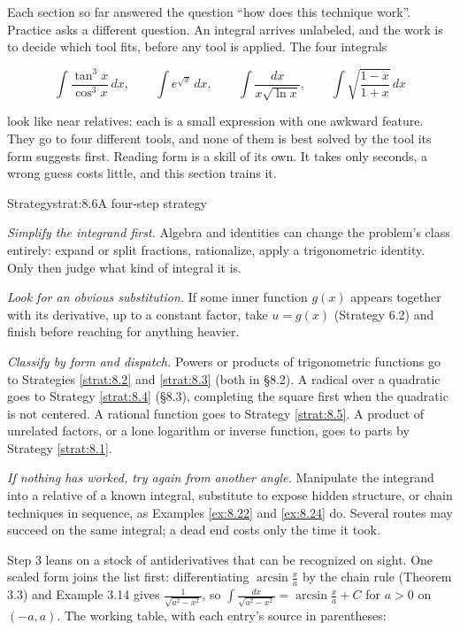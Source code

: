 \documentclass[a4paper,12pt,oneside]{memoir}
\begin{document}
Each section so far answered the question “how does this technique work”. Practice asks a different question. An integral arrives unlabeled, and the work is to decide which tool fits, before any tool is applied. The four integrals

\[ \int \frac{\tan^{3}x}{\cos^{3}x}\,dx, \qquad \int e^{\sqrt{x}}\,dx, \qquad \int \frac{dx}{x\sqrt{\ln x}}, \qquad \int \sqrt{\frac{1 - x}{1 + x}}\,dx \]

look like near relatives: each is a small expression with one awkward feature. They go to four different tools, and none of them is best solved by the tool its form suggests first. Reading form is a skill of its own. It takes only seconds, a wrong guess costs little, and this section trains it.

\begin{envstrategy}{Strategy}{strat:8.6}{A four-step strategy}
\begin{steps}
  \item \emph{Simplify the integrand first.} Algebra and identities can change the problem’s class entirely: expand or split fractions, rationalize, apply a trigonometric identity. Only then judge what kind of integral it is.
  \item \emph{Look for an obvious substitution.} If some inner function \(g(x)\) appears together with its derivative, up to a constant factor, take \(u = g(x)\) (Strategy 6.2) and finish before reaching for anything heavier.
  \item \emph{Classify by form and dispatch.} Powers or products of trigonometric functions go to Strategies \ref{strat:8.2} and \ref{strat:8.3} (both in §8.2). A radical over a quadratic goes to Strategy \ref{strat:8.4} (§8.3), completing the square first when the quadratic is not centered. A rational function goes to Strategy \ref{strat:8.5}. A product of unrelated factors, or a lone logarithm or inverse function, goes to parts by Strategy \ref{strat:8.1}.
  \item \emph{If nothing has worked, try again from another angle.} Manipulate the integrand into a relative of a known integral, substitute to expose hidden structure, or chain techniques in sequence, as Examples \ref{ex:8.22} and \ref{ex:8.24} do. Several routes may succeed on the same integral; a dead end costs only the time it took.
\end{steps}
\end{envstrategy}
Step 3 leans on a stock of antiderivatives that can be recognized on sight. One scaled form joins the list first: differentiating \(\arcsin\tfrac{x}{a}\) by the chain rule (Theorem 3.3) and Example 3.14 gives \(\tfrac{1}{\sqrt{a^{2} - x^{2}}}\), so \(\int\tfrac{dx}{\sqrt{a^{2} - x^{2}}} = \arcsin\tfrac{x}{a} + C\) for \(a > 0\) on \((-a, a)\). The working table, with each entry’s source in parentheses:
\end{document}
